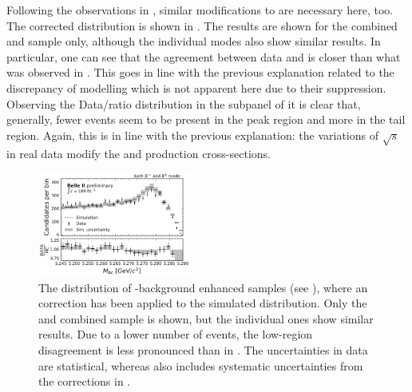 Following the observations in , similar modifications to \Mbc are necessary here, too.
The corrected \Mbc distribution is shown in .
The results are shown for the combined \feiBp and \feiBz sample only, although the individual \FEI modes also show similar results.
In particular, one can see that the agreement between data and \MC is closer than what was observed in .
This goes in line with the previous explanation related to the discrepancy of \epem\ra\qqbar modelling which is not apparent here due to their suppression.
Observing the Data/\MC ratio distribution in the subpanel of  it is clear that, generally, fewer events seem to be present in the peak region and more in the tail region.
Again, this is in line with the previous explanation: the variations of $\sqrt{s}$ in real data modify the \FourS and \epem\ra\qqbar production cross-sections.
\begin{figure}[hbtp!]
    \centering
    \includegraphics[width=0.45\textwidth]{figures/data_validation/Bboth_bbbar_enhanced_mbccorrected.pdf}
    \caption{\label{fig:bbbar_enhanced_mbccorrected} The \Mbc distribution of \BB-background enhanced samples (see ),
    where an \Mbc correction has been applied to the simulated distribution.
    Only the \feiBp and \feiBz combined sample is shown, but the individual ones show similar results.
    Due to a lower number of \epem\ra\qqbar events, the low-\Mbc region disagreement is less pronounced than in .
    The uncertainties in data are statistical, whereas \MC also includes systematic uncertainties from the corrections in .
    }
\end{figure}


